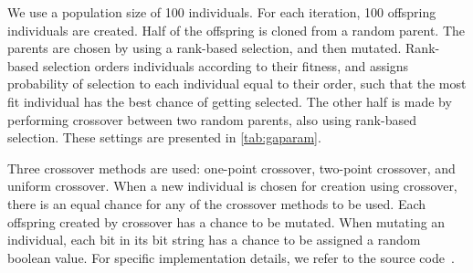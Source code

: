 We use a population size of \num{100} individuals. For each iteration, \num{100} offspring individuals are created. Half of the offspring is cloned from a random parent. The parents are chosen by using a rank-based selection, and then mutated. Rank-based selection orders individuals according to their fitness, and assigns probability of selection to each individual equal to their order, such that the most fit individual has the best chance of getting selected. The other half is made by performing crossover between two random parents, also using rank-based selection. These settings are presented in \cref{tab:gaparam}.

Three crossover methods are used: one-point crossover, two-point crossover, and uniform crossover. When a new individual is chosen for creation using crossover, there is an equal chance for any of the crossover methods to be used. Each offspring created by crossover has a  chance to be mutated. When mutating an individual, each bit in its bit string has a  chance to be assigned a random boolean value. For specific implementation details, we refer to the source code~\cite{mbm:kmc:ekoGA}.




